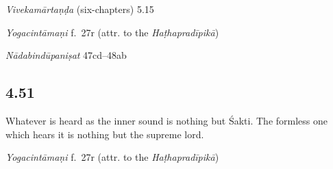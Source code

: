\begin{ekdosis}
\begin{sources}[hp04_050]
\emph{Vivekamārtaṇḍa} (six-chapters) 5.15 %
\begin{versinnote}
\end{versinnote}
\end{sources}

\begin{testimonia}[hp04_050]
\emph{Yogacintāmaṇi} f.~27r (attr. to the \emph{Haṭhapradīpikā})
\begin{versinnote}
\end{versinnote}

\emph{Nādabindūpaniṣat} 47cd–48ab
\begin{versinnote}
\end{versinnote}
\end{testimonia}

\subsection*{4.51}
\begin{translation}[hp04_051]
Whatever is heard as the inner sound is nothing but Śakti. The formless one which hears it is nothing but the supreme lord.
\end{translation}



\begin{testimonia}[hp04_051]
\emph{Yogacintāmaṇi} f.~27r (attr. to the \emph{Haṭhapradīpikā})
\begin{versinnote}
\end{versinnote}


\end{testimonia}
\end{ekdosis}
